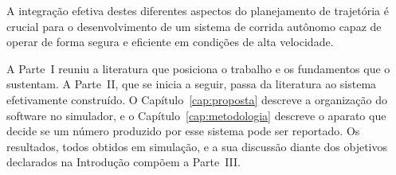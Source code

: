A integração efetiva destes diferentes aspectos do planejamento de trajetória é
crucial para o desenvolvimento de um sistema de corrida autônomo capaz de
operar de forma segura e eficiente em condições de alta velocidade.

A Parte~I reuniu a literatura que posiciona o trabalho e os fundamentos que o
sustentam. A Parte~II, que se inicia a seguir, passa da literatura ao
sistema efetivamente construído. O Capítulo~\ref{cap:proposta} descreve a
organização do software no simulador, e o Capítulo~\ref{cap:metodologia}
descreve o aparato que decide se um número produzido por esse sistema pode ser
reportado. Os resultados, todos obtidos em simulação, e a sua discussão diante
dos objetivos declarados na Introdução compõem a Parte~III.
